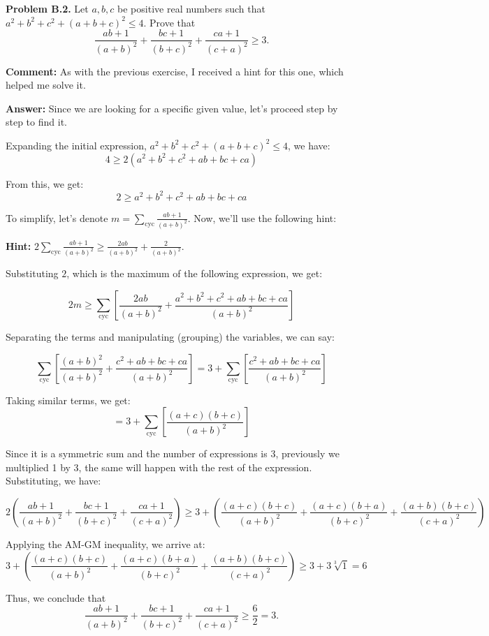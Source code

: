 \documentclass{article}
\begin{document}
\textbf{Problem B.2.} Let \( a, b, c \) be positive real numbers such that \( a^2 + b^2 + c^2 + (a + b + c)^2 \leq 4 \). Prove that
\[
\frac{ab + 1}{(a + b)^2} + \frac{bc + 1}{(b + c)^2} + \frac{ca + 1}{(c + a)^2} \geq 3.
\]

\textbf{Comment:} As with the previous exercise, I received a hint for this one, which helped me solve it.

\textbf{Answer:} Since we are looking for a specific given value, let's proceed step by step to find it.

Expanding the initial expression, \( a^2 + b^2 + c^2 + (a + b + c)^2 \leq 4 \), we have:
\[
4 \geq 2(a^2 + b^2 + c^2 + ab + bc + ca)
\]

From this, we get:
\[
2 \geq a^2 + b^2 + c^2 + ab + bc + ca
\]

To simplify, let's denote \( m = \sum_{\text{cyc}} \frac{ab + 1}{(a + b)^2} \). Now, we'll use the following hint:

\textbf{Hint:} \( 2 \sum_{\text{cyc}} \frac{ab + 1}{(a + b)^2} \geq \frac{2ab}{(a + b)^2} + \frac{2}{(a + b)^2} \).

Substituting \( 2 \), which is the maximum of the following expression, we get:

\[
2m \geq \sum_{\text{cyc}}\left[\frac{2ab}{(a + b)^2} + \frac{a^2 + b^2 + c^2 + ab + bc + ca}{(a + b)^2}\right]
\]

Separating the terms and manipulating (grouping) the variables, we can say:

\[
\sum_{\text{cyc}}\left[\frac{(a + b)^2}{(a + b)^2} + \frac{c^2 + ab + bc + ca}{(a + b)^2}\right] = 3 + \sum_{\text{cyc}}\left[\frac{c^2 + ab + bc + ca}{(a + b)^2}\right]
\]

Taking similar terms, we get:
\[
= 3 + \sum_{\text{cyc}}\left[\frac{(a + c)(b + c)}{(a + b)^2}\right]
\]

Since it is a symmetric sum and the number of expressions is 3, previously we multiplied 1 by 3, the same will happen with the rest of the expression. Substituting, we have:

\[
2\left(\frac{ab + 1}{(a + b)^2} + \frac{bc + 1}{(b + c)^2} + \frac{ca + 1}{(c + a)^2}\right) \geq 3 + \left(\frac{(a+c)(b+c)}{(a + b)^2} + \frac{(a+c)(b+a)}{(b + c)^2} + \frac{(a+b)(b+c)}{(c + a)^2}\right)
\]

Applying the AM-GM inequality, we arrive at:
\[
3 + \left(\frac{(a+c)(b+c)}{(a + b)^2} + \frac{(a+c)(b+a)}{(b + c)^2} + \frac{(a+b)(b+c)}{(c + a)^2}\right) \geq 3 + 3\sqrt[3]{1} = 6
\]

Thus, we conclude that
\[
\frac{ab + 1}{(a + b)^2} + \frac{bc + 1}{(b + c)^2} + \frac{ca + 1}{(c + a)^2} \geq \frac{6}{2} = 3.
\]
\end{document}
